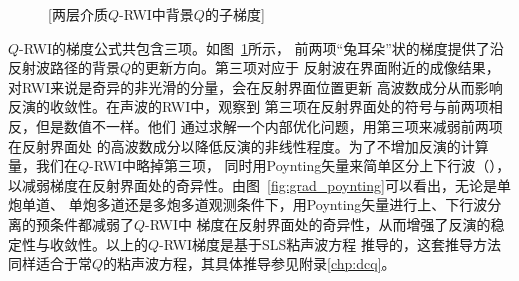 \begin{figure}[!htbp]
    \centering
    [两层介质$Q$-RWI中背景$Q$的子梯度]
    \label{fig:grad_qrwi}
\end{figure}

$Q$-RWI的梯度公式共包含三项。如图~\ref{fig:grad_qrwi}所示，
前两项“兔耳朵”状的梯度提供了沿反射波路径的背景$Q$的更新方向。第三项对应于
反射波在界面附近的成像结果，对RWI来说是奇异的非光滑的分量，会在反射界面位置更新
高波数成分从而影响反演的收敛性。在声波的RWI中，观察到
第三项在反射界面处的符号与前两项相反，但是数值不一样。他们
通过求解一个内部优化问题，用第三项来减弱前两项在反射界面处
的高波数成分以降低反演的非线性程度。为了不增加反演的计算量，我们在$Q$-RWI中略掉第三项，
同时用Poynting矢量来简单区分上下行波（），
以减弱梯度在反射界面处的奇异性。由图~\ref{fig:grad_poynting}可以看出，无论是单炮单道、
单炮多道还是多炮多道观测条件下，用Poynting矢量进行上、下行波分离的预条件都减弱了$Q$-RWI中
梯度在反射界面处的奇异性，从而增强了反演的稳定性与收敛性。以上的$Q$-RWI梯度是基于SLS粘声波方程
推导的，这套推导方法同样适合于常$Q$的粘声波方程，其具体推导参见附录\ref{chp:dcq}。


